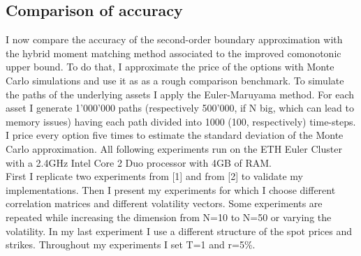 \documentclass[a4paper]{article}
\begin{document}
\subsection{Comparison of accuracy}
\label{sec:accuracy}
I now compare the accuracy of the second-order boundary approximation with the hybrid moment matching method associated to the improved comonotonic upper bound. To do that, I approximate the price of the options with Monte Carlo simulations and use it as as a rough comparison benchmark. To simulate the paths of the underlying assets I apply the Euler-Maruyama method. For each asset I generate 1'000'000 paths (respectively 500'000, if N big, which can lead to memory issues) having each path divided into 1000 (100, respectively) time-steps. I price every option five times to estimate the standard deviation of the Monte Carlo approximation. All following experiments run on the ETH Euler Cluster with a 2.4GHz Intel Core 2 Duo processor with 4GB of RAM. \\
First I replicate two experiments from [1] and from [2] to validate my implementations. Then I present my experiments for which I choose different correlation matrices and different volatility vectors. Some experiments are repeated while increasing the dimension from N=10 to N=50 or varying the volatility. In my last experiment I use a different structure of the spot prices and strikes. Throughout my experiments I set T=1 and r=5\%.\\
\end{document}
